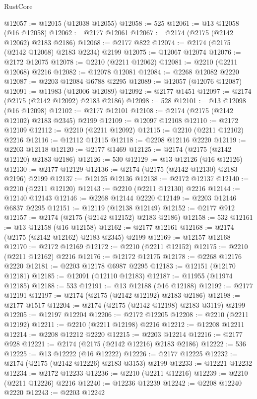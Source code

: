 \begin{lexlean}{RustCore}
\begin{coremodule}
@12057 := @12015 (@12038 @12055)
@12058 := 525
@12061 := @13 @12058 (@16 @12058)
@12062 := @2177 @12061
@12067 := @2174 (@2175 (@2142 @12062) @2183 @2186)
@12068 := @2177 @822
@12074 := @2174 (@2175 (@2142 @12068) @2183 @2234) @2199
@12075 := @12067 @12074
@12076 := @2172 @12075
@12078 := @2210 (@2211 @12062)
@12081 := @2210 (@2211 @12068) @2216
@12082 := @12078 @12081
@12084 := @2268 @12082 @2220
@12087 := @2203 @12084 @6788 @2295
@12089 := @12057 (@12076 @12087)
@12091 := @11983 (@12006 @12089)
@12092 := @2177 @1451
@12097 := @2174 (@2175 (@2142 @12092) @2183 @2186)
@12098 := 528
@12101 := @13 @12098 (@16 @12098)
@12102 := @2177 @12101
@12108 := @2174 (@2175 (@2142 @12102) @2183 @2345) @2199
@12109 := @12097 @12108
@12110 := @2172 @12109
@12112 := @2210 (@2211 @12092)
@12115 := @2210 (@2211 @12102) @2216
@12116 := @12112 @12115
@12118 := @2208 @12116 @2220
@12119 := @2203 @12118
@12120 := @2177 @1469
@12125 := @2174 (@2175 (@2142 @12120) @2183 @2186)
@12126 := 530
@12129 := @13 @12126 (@16 @12126)
@12130 := @2177 @12129
@12136 := @2174 (@2175 (@2142 @12130) @2183 @2196) @2199
@12137 := @12125 @12136
@12138 := @2172 @12137
@12140 := @2210 (@2211 @12120)
@12143 := @2210 (@2211 @12130) @2216
@12144 := @12140 @12143
@12146 := @2268 @12144 @2220
@12149 := @2203 @12146 @6837 @2295
@12151 := @12119 (@12138 @12149)
@12152 := @2177 @912
@12157 := @2174 (@2175 (@2142 @12152) @2183 @2186)
@12158 := 532
@12161 := @13 @12158 (@16 @12158)
@12162 := @2177 @12161
@12168 := @2174 (@2175 (@2142 @12162) @2183 @2345) @2199
@12169 := @12157 @12168
@12170 := @2172 @12169
@12172 := @2210 (@2211 @12152)
@12175 := @2210 (@2211 @12162) @2216
@12176 := @12172 @12175
@12178 := @2268 @12176 @2220
@12181 := @2203 @12178 @6987 @2295
@12183 := @12151 (@12170 @12181)
@12185 := @12091 (@12110 @12183)
@12187 := @11955 (@11974 @12185)
@12188 := 533
@12191 := @13 @12188 (@16 @12188)
@12192 := @2177 @12191
@12197 := @2174 (@2175 (@2142 @12192) @2183 @2186)
@12198 := @2177 @1517
@12204 := @2174 (@2175 (@2142 @12198) @2183 @3119) @2199
@12205 := @12197 @12204
@12206 := @2172 @12205
@12208 := @2210 (@2211 @12192)
@12211 := @2210 (@2211 @12198) @2216
@12212 := @12208 @12211
@12214 := @2208 @12212 @2220
@12215 := @2203 @12214
@12216 := @2177 @928
@12221 := @2174 (@2175 (@2142 @12216) @2183 @2186)
@12222 := 536
@12225 := @13 @12222 (@16 @12222)
@12226 := @2177 @12225
@12232 := @2174 (@2175 (@2142 @12226) @2183 @3153) @2199
@12233 := @12221 @12232
@12234 := @2172 @12233
@12236 := @2210 (@2211 @12216)
@12239 := @2210 (@2211 @12226) @2216
@12240 := @12236 @12239
@12242 := @2208 @12240 @2220
@12243 := @2203 @12242

\end{coremodule}
\end{lexlean}
